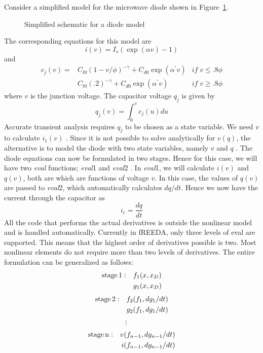 Consider a simplified model for the microwave diode shown in Figure~\ref{diode_schematic_eval}.
\begin{figure}
\centerline{}
\caption{\label{diode_schematic_eval}Simplified schematic for a diode model}
\end{figure}
The corresponding equations for this model are
\begin{equation}
i(v) = I_s (\exp( \alpha v ) - 1 )
\end{equation}
and
\begin{eqnarray}
c_j(v) = & C_{t0}(1 - {v / \phi})^{-\gamma} + C_{d0} \exp{(\alpha^{'}v)} & if\; v \leq .8\phi\\
         & C_{t0}(.2) ^{-\gamma} + C_{d0} \exp{(\alpha^{'}v)} & if\; v \geq .8\phi
\end{eqnarray}
where $v$ is the junction voltage. The capacitor voltage $q_j$ is given by
\begin{equation}
q_j ( v ) = \int_0^v c_j ( u ) du
\end{equation}
Accurate transient analysis requires $q_j$ to be chosen as a state variable.
We need $v$ to calculate $i_1( v )$ . Since it is
not possible to solve analytically
for $v ( q )$, the alternative is to model the diode with two state
variables, namely $v$ and $q$ . The diode equations
can now be formulated in two stages. Hence for this case, we
will have two \emph{eval} functions; \emph{eval}1 and \emph{eval}2 .
In \emph{eval}1, we will calculate $i(v)$ and
$q(v)$, both are which are functions of voltage $v$. In this case, the
values of $q(v)$ are passed to \emph{eval}2, which automatically calculates $d q /
d t$. Hence we now have the current through the capacitor as
\begin{equation}
i_c = \frac{d q}{d t}
\end{equation}
All the code that performs the actual derivatives is outside the nonlinear
model and is handled automatically. Currently in fREEDA, only three levels of
eval are supported. This means that the highest order of derivatives possible
is two. Most nonlinear elements do not require more than two levels of
derivatives. The entire formulation can be generalized as follows:
\begin{eqnarray}
  \rm{stage} \, 1 & : & f_1 ( x, x_D ) \nonumber \\
  &  & g_1 ( x, x_D )
\end{eqnarray}
\begin{eqnarray}
  \rm{stage} \, 2 & : & f_2 ( f_1, d g_1 / d t ) \nonumber \\
  &  & g_2 ( f_1, d g_1 / d t )
\end{eqnarray}
\begin{eqnarray}
  \vdots &  & \nonumber
\end{eqnarray}
\begin{eqnarray}
  \rm{stage} \, n & : & v_{} ( f_{n - 1}, d g_{n - 1} / d t ) \nonumber \\
  &  & i ( f_{n - 1}, d g_{n - 1} / d t )
\end{eqnarray}
